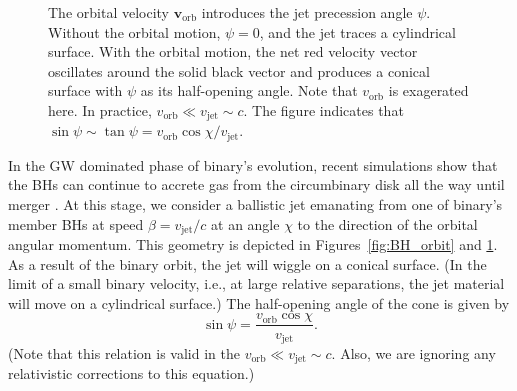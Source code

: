 \documentclass[a4paper,fleqn,usenatbib]{mnras}
\begin{document}
\begin{figure}
  \begin{center}
  \end{center}
  \caption{The orbital velocity $\mathbf{v}_\mathrm{orb}$
    introduces the jet precession angle $\psi$.  Without the orbital
    motion, $\psi=0$, and the jet traces a cylindrical surface.  With
    the orbital motion, the net red velocity vector oscillates around
    the solid black vector and produces a conical surface with $\psi$
    as its half-opening angle.  Note that $v_\mathrm{orb}$ is
    exagerated here.  In practice, $v_\mathrm{orb}\ll
    v_\mathrm{jet}\sim c$.  The figure indicates that
    $\sin{\psi}\sim\tan{\psi}=v_\mathrm{orb}\cos{\chi}/v_\mathrm{jet}$.}
  \label{fig:jet}
\end{figure}

In the GW dominated phase of binary's evolution, recent simulations
show that the BHs can continue to accrete gas from the circumbinary
disk all the way until merger \citep{2015MNRAS.446L..36F}.  At this
stage, we consider a ballistic jet emanating from one of binary's
member BHs at speed $\beta=v_\mathrm{jet}/c$ at an angle $\chi$ to the
direction of the orbital angular momentum.  This geometry is depicted
in Figures~\ref{fig:BH_orbit} and \ref{fig:jet}.  As a result of the
binary orbit, the jet will wiggle on a conical surface.  (In the limit
of a small binary velocity, i.e., at large relative separations, the
jet material will move on a cylindrical surface.)  The half-opening
angle of the cone is given by \citep{1993ApJ...409..130R}
\begin{equation}
  \sin\psi = \frac{v_\mathrm{orb}\cos\chi}{v_\mathrm{jet}}.
\end{equation}
(Note that this relation is valid in the $v_\mathrm{orb}\ll
v_\mathrm{jet}\sim c$. Also, we are ignoring any relativistic
corrections to this equation.)
\end{document}
